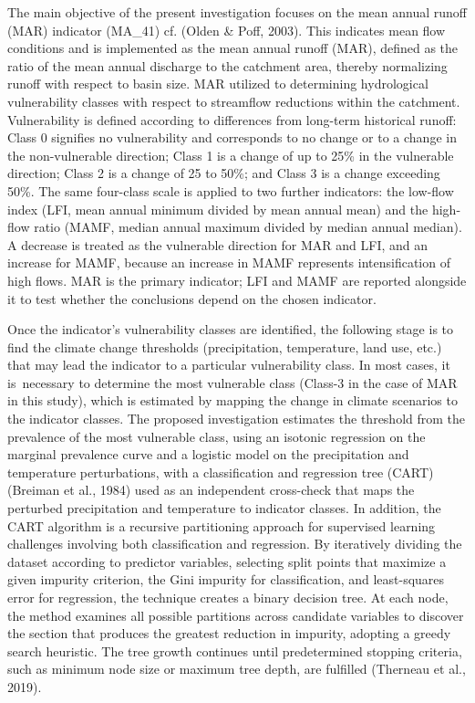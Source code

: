 \documentclass[
]{article}
\begin{document}
The main objective of the present investigation focuses on the mean
annual runoff (MAR) indicator (MA\_41) cf. (Olden \& Poff, 2003). This
indicates mean flow conditions and is implemented as the mean annual
runoff (MAR), defined as the ratio of the mean annual discharge to the
catchment area, thereby normalizing runoff with respect to basin size.
MAR utilized to determining hydrological vulnerability classes with
respect to streamflow reductions within the catchment. Vulnerability is
defined according to differences from long-term historical runoff: Class
0 signifies no vulnerability and corresponds to no change or to a change
in the non-vulnerable direction; Class 1 is a change of up to 25\% in
the vulnerable direction; Class 2 is a change of 25 to 50\%; and Class 3
is a change exceeding 50\%. The same four-class scale is applied to two
further indicators: the low-flow index (LFI, mean annual minimum divided
by mean annual mean) and the high-flow ratio (MAMF, median annual
maximum divided by median annual median). A decrease is treated as the
vulnerable direction for MAR and LFI, and an increase for MAMF, because
an increase in MAMF represents intensification of high flows. MAR is the
primary indicator; LFI and MAMF are reported alongside it to test
whether the conclusions depend on the chosen indicator.

Once the indicator's vulnerability classes are identified, the following
stage is to find the climate change thresholds (precipitation,
temperature, land use, etc.) that may lead the indicator to a particular
vulnerability class. In most cases, it is~necessary to determine the
most vulnerable class (Class-3 in the case of MAR in this study), which
is estimated by mapping the change in climate scenarios to the indicator
classes. The proposed investigation estimates the threshold from the
prevalence of the most vulnerable class, using an isotonic regression on
the marginal prevalence curve and a logistic model on the precipitation
and temperature perturbations, with a classification and regression tree
(CART) (Breiman et al., 1984) used as an independent cross-check that
maps the perturbed precipitation and temperature to indicator classes.
In addition, the CART algorithm is a recursive partitioning approach for
supervised learning challenges involving both classification and
regression. By iteratively dividing the dataset according to predictor
variables, selecting split points that maximize a given impurity
criterion, the Gini impurity for classification, and least-squares error
for regression, the technique creates a binary decision tree. At each
node, the method examines all possible partitions across candidate
variables to discover the section that produces the greatest reduction
in impurity, adopting a greedy search heuristic. The tree growth
continues until predetermined stopping criteria, such as minimum node
size or maximum tree depth, are fulfilled (Therneau et al., 2019).
\end{document}
